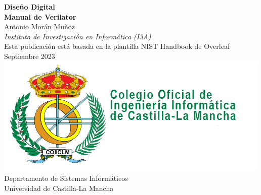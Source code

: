 \begin{titlepage}
\begin{flushright}
\LARGE{\textbf{Diseño Digital}}\\
\vfill 
\Huge{\textbf{Manual de Verilator}}\\
    \vfill
    \normalsize Antonio Morán Muñoz\\
     \textit{Instituto de Investigación en Informática (I3A)}\\
    \vfill
\normalsize Esta publicación está basada en la plantilla NIST Handbook de Overleaf\\
\vfill
\normalsize Septiembre 2023
\vfill
\includegraphics[width=0.5\linewidth]{figs/logo-cooiiclm.png}\\ 
 \vfill
\footnotesize Departamento de Sistemas Informáticos\\ 
\vspace{10pt}
Universidad de Castilla-La Mancha\\ 
\end{flushright}
\end{titlepage}


